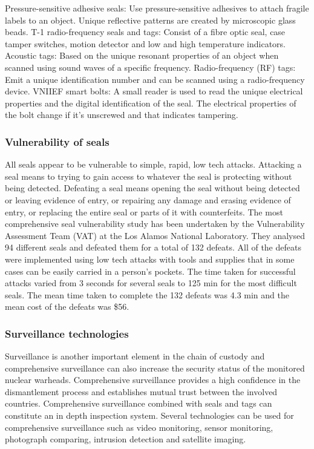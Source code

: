 \documentclass[twoside,titlepage,11pt,twocolumn,a4paper]{article}
\begin{document}
Pressure-sensitive adhesive seals: Use pressure-sensitive adhesives to
attach fragile labels to an object. Unique reflective patterns are
created by microscopic glass beads.  T-1 radio-frequency seals and
tags: Consist of a fibre optic seal, case tamper switches, motion
detector and low and high temperature indicators.  Acoustic tags:
Based on the unique resonant properties of an object when scanned
using sound waves of a specific frequency.  Radio-frequency (RF) tags:
Emit a unique identification number and can be scanned using a
radio-frequency device.  VNIIEF smart bolts: A small reader is used to
read the unique electrical properties and the digital identification
of the seal. The electrical properties of the bolt change if it’s
unscrewed and that indicates tampering.

\subsubsection{Vulnerability of seals}
All seals appear to be vulnerable to simple, rapid, low tech
attacks. Attacking a seal means to trying to gain access to whatever
the seal is protecting without being detected. Defeating a seal means
opening the seal without being detected or leaving evidence of entry,
or repairing any damage and erasing evidence of entry, or replacing
the entire seal or parts of it with counterfeits. The most
comprehensive seal vulnerability study has been undertaken by the
Vulnerability Assessment Team (VAT) at the Los Alamos National
Laboratory. They analysed 94 different seals and defeated them for a
total of 132 defeats. All of the defeats were implemented using low
tech attacks with tools and supplies that in some cases can be easily
carried in a person’s pockets. The time taken for successful attacks
varied from 3 seconds for several seals to 125 min for the most
difficult seals. The mean time taken to complete the 132 defeats was
4.3 min and the mean cost of the defeats was \$56. \citep{vulnSecSeals1997}

\subsubsection{Surveillance technologies}
Surveillance is another important element in the chain of custody and
comprehensive surveillance can also increase the security status of
the monitored nuclear warheads. Comprehensive surveillance provides a
high confidence in the dismantlement process and establishes mutual
trust between the involved countries. Comprehensive surveillance
combined with seals and tags can constitute an in depth inspection
system. Several technologies can be used for comprehensive
surveillance such as video monitoring, sensor monitoring, photograph
comparing, intrusion detection and satellite
imaging. \citep{wuwen2004}
\end{document}
